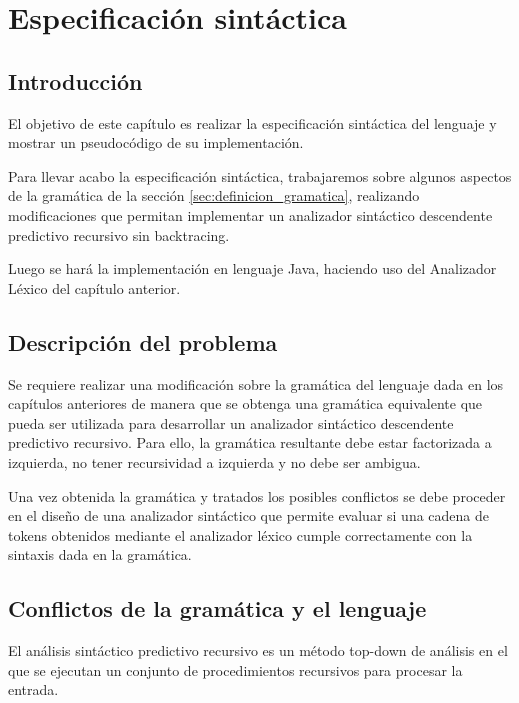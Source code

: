 \chapter{Especificación sintáctica}

\section{Introducción}
El objetivo de este capítulo es realizar la especificación sintáctica del lenguaje y mostrar un pseudocódigo de su implementación.

Para llevar acabo la especificación sintáctica, trabajaremos sobre algunos aspectos de la gramática de la sección \ref{sec:definicion_gramatica}, realizando modificaciones que permitan implementar un analizador sintáctico descendente predictivo recursivo sin backtracing.

Luego se hará la implementación en lenguaje Java, haciendo uso del Analizador Léxico del capítulo anterior.

\section{Descripción del problema}
Se requiere realizar una modificación sobre la gramática del lenguaje dada en los capítulos anteriores de manera que se obtenga una gramática equivalente que pueda ser utilizada para desarrollar un analizador sintáctico descendente predictivo recursivo. Para ello, la gramática resultante debe estar factorizada a izquierda, no tener recursividad a izquierda y no debe ser ambigua.

Una vez obtenida la gramática y tratados los posibles conflictos se debe proceder en el diseño de una analizador sintáctico que permite evaluar si una cadena de tokens obtenidos mediante el analizador léxico cumple correctamente con la sintaxis dada en la gramática.

\section{Conflictos de la gramática y el lenguaje}
El análisis sintáctico predictivo recursivo es un método top-down de análisis en el que se ejecutan un conjunto de procedimientos recursivos para procesar la entrada.

